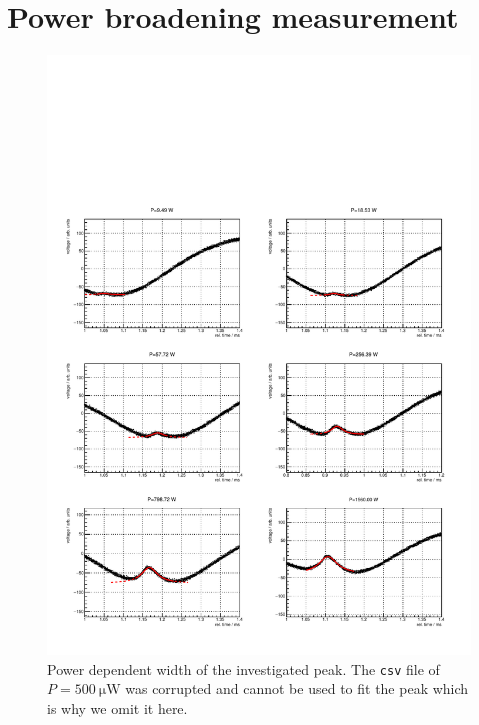 \documentclass[11pt,a4paper,notitlepage]{scrartcl}
\begin{document}
\section{Power broadening measurement}

\begin{figure}[H]
	\centering
	\includegraphics[width=\linewidth]{figs/measurements/widths.pdf}
	\caption{Power dependent width of the investigated peak. The \texttt{csv} file of $P=\SI{500}{\micro\W}$ was corrupted and cannot be used to fit the peak which is why we omit it here.}
	\label{fig:widthpower}
\end{figure}
\end{document}
